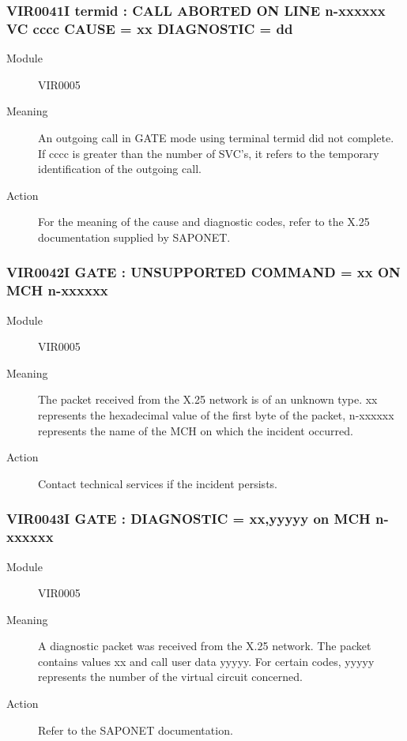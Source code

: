 \documentclass[letterpaper,10pt,english]{sphinxmanual}
\begin{document}
\subsubsection{VIR0041I termid : CALL ABORTED ON LINE n-xxxxxx VC cccc CAUSE = xx DIAGNOSTIC = dd}
\label{\detokenize{messages:vir0041i-termid-call-aborted-on-line-n-xxxxxx-vc-cccc-cause-xx-diagnostic-dd}}\begin{description}
\item[{Module}] \leavevmode
VIR0005

\item[{Meaning}] \leavevmode
An outgoing call in GATE mode using terminal termid did not complete. If cccc is greater than the number of SVC’s, it refers to the temporary identification of the outgoing call.

\item[{Action}] \leavevmode
For the meaning of the cause and diagnostic codes, refer to the X.25 documentation supplied by SAPONET.

\end{description}


\subsubsection{VIR0042I GATE : UNSUPPORTED COMMAND = xx ON MCH n-xxxxxx}
\label{\detokenize{messages:vir0042i-gate-unsupported-command-xx-on-mch-n-xxxxxx}}\begin{description}
\item[{Module}] \leavevmode
VIR0005

\item[{Meaning}] \leavevmode
The packet received from the X.25 network is of an unknown type. xx represents the hexadecimal value of the first byte of the packet, n-xxxxxx represents the name of the MCH on which the incident occurred.

\item[{Action}] \leavevmode
Contact technical services if the incident persists.

\end{description}


\subsubsection{VIR0043I GATE : DIAGNOSTIC = xx,yyyyy on MCH n-xxxxxx}
\label{\detokenize{messages:vir0043i-gate-diagnostic-xx-yyyyy-on-mch-n-xxxxxx}}\begin{description}
\item[{Module}] \leavevmode
VIR0005

\item[{Meaning}] \leavevmode
A diagnostic packet was received from the X.25 network. The packet contains values xx and call user data yyyyy. For certain codes, yyyyy represents the number of the virtual circuit concerned.

\item[{Action}] \leavevmode
Refer to the SAPONET documentation.

\end{description}
\end{document}
